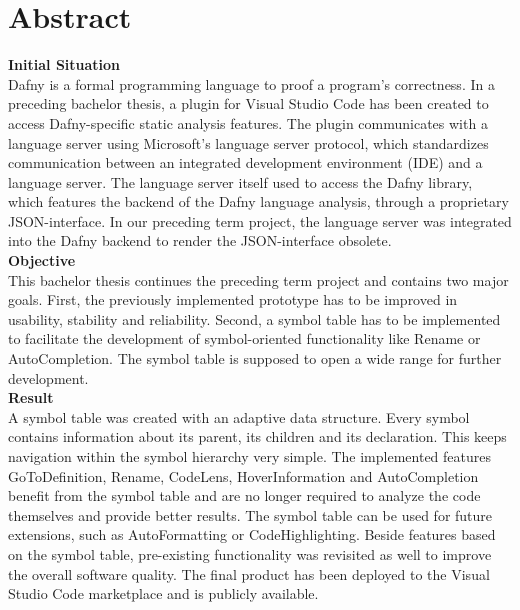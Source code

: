 \section{Abstract}
\label{section:abstract}

\textbf{Initial Situation}\\
Dafny is a formal programming language to proof a program's correctness.
In a preceding bachelor thesis, a plugin for Visual Studio Code has been created to access Dafny-specific static analysis features.
The plugin communicates with a language server using Microsoft's language server protocol,
which standardizes communication between an integrated development environment (IDE) and a language server.
The language server itself used to access the Dafny library, which features the backend of the Dafny language analysis,
through a proprietary JSON-interface.
In our preceding term project, the language server was integrated into the Dafny backend to render the JSON-interface obsolete. \\

\textbf{Objective}\\
This bachelor thesis continues the preceding term project and contains two major goals.
First, the previously implemented prototype has to be improved in usability, stability and reliability.
Second, a symbol table has to be implemented to facilitate the development
of symbol-oriented functionality like Rename or AutoCompletion.
The symbol table is supposed to open a wide range for further development.\\

\textbf{Result}\\
A symbol table was created with an adaptive data structure.
Every symbol contains information about its parent, its children and its declaration.
This keeps navigation within the symbol hierarchy very simple.
The implemented features GoToDefinition, Rename, CodeLens, HoverInformation and AutoCompletion benefit from the symbol table and are no longer required to analyze the code themselves and provide better results.
The symbol table can be used for future extensions, such as AutoFormatting or CodeHighlighting.
Beside features based on the symbol table, pre-existing functionality was revisited as well to improve the overall software quality.
The final product has been deployed to the Visual Studio Code marketplace and is publicly available.
